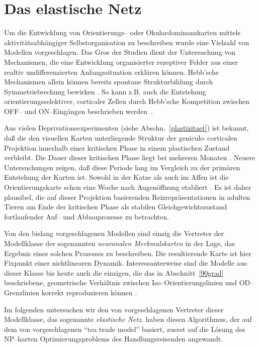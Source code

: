\section{Das elastische Netz}
\label{modell}
\thispagestyle{plain}

Um die Entwicklung von Orientierungs-- oder Okulardominanzkarten mittels
aktivitätsabhängiger Selbstorganisation zu beschreiben wurde eine
Vielzahl von Modellen vorgeschlagen.  Das Gros der Studien dient der
Untersuchung von Mechanismen, die eine Entwicklung organisierter rezeptiver
Felder aus einer realtiv undifferenzierten Anfangssituation erklären
können. Hebb'sche Mechanismen allein können bereits spontane
Strukturbildung durch Symmetriebrechung bewirken \cite{linsker:1986}.  So
kann z.B. auch die Entstehung orientierungsselektiver, corticaler Zellen
durch Hebb'sche Kompetition zwischen OFF-- und ON--Eingängen beschrieben
werden~\cite{miller:1994}.

Aus vielen Deprivationsexperimenten (siehe Abschn.~\ref{plastizitaet}) ist
bekannt, daß die den visuellen Karten unterliegende Struktur der
geniculo--corticalen Projektion innerhalb einer kritischen Phase in einem
plastischen Zustand verbleibt.  Die Dauer dieser kritischen Phase liegt bei
mehreren Monaten \cite{hubel:1970}.  Neuere Untersuchungen zeigen, daß
diese Periode lang im Vergleich zu der primären Entstehung der Karten
ist. Sowohl in der Katze als auch im Affen ist die Orientierungskarte schon
eine Woche nach Augenöffnung etabliert
\cite{bonhoeffer:1995,blasdel:1995}.  Es ist daher plausibel, die auf
dieser Projektion basierenden Reizrepräsentationen in adulten Tieren am
Ende der kritischen Phase als stabilen Gleichgewichtszustand fortlaufender
Auf-- und Abbauprozesse zu betrachten.

Von den bislang vorgeschlagenen Modellen sind einzig die Vertreter der
Modellklasse der sogenannten \emph{neuronalen Merkmalskarten} in der Lage,
das Ergebnis eines solchen Prozesses zu beschreiben. Die resultierende
Karte ist hier Fixpunkt einer nichtlinearen Dynamik.  Interessanterweise
sind die Modelle aus dieser Klasse bis heute auch die einzigen, die das in
Abschnitt~\ref{90grad} beschriebene, geometrische Verhältnis zwischen
Iso--Orientierungslinien und OD--Grenzlinien korrekt reproduzieren können
.

Im folgenden untersuchen wir den von 
vorgeschlagenen Vertreter dieser Modellklasse, das sogenannte
\emph{elastische Netz}.  haben diesen Algorithmus,
der auf dem von \protect{} vorgeschlagenen ``tea
trade model'' basiert, zuerst auf die Lösung des
NP--harten Optimierungsproblems des Handlungsreisenden angewandt.

